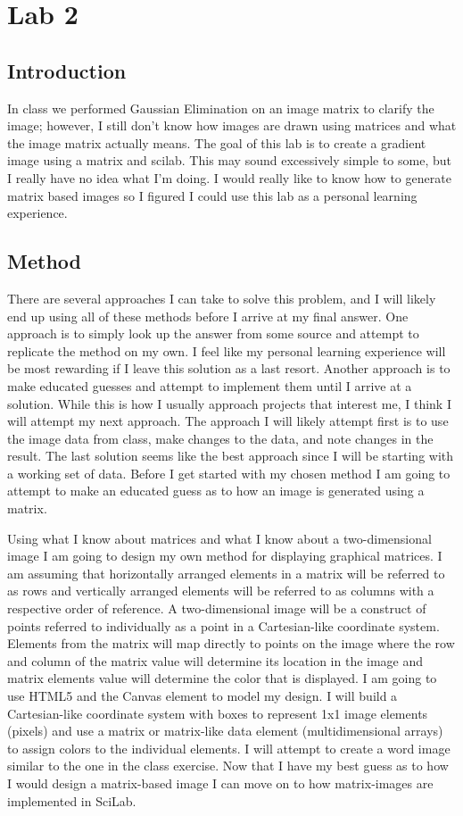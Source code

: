 
\section{Lab 2}
\subsection{Introduction}
In class we performed Gaussian Elimination on an image matrix to clarify the image; however, I still don't know how images are drawn using matrices and what the image matrix actually means. The goal of this lab is to create a gradient image using a matrix and scilab. This may sound excessively simple to some, but I really have no idea what I'm doing. I would really like to know how to generate matrix based images so I figured I could use this lab as a personal learning experience.

\subsection{Method}
There are several approaches I can take to solve this problem, and I will likely end up using all of these methods before I arrive at my final answer. One approach is to simply look up the answer from some source and attempt to replicate the method on my own. I feel like my personal learning experience will be most rewarding if I leave this solution as a last resort. Another approach is to make educated guesses and attempt to implement them until I arrive at a solution. While this is how I usually approach projects that interest me, I think I will attempt my next approach. The approach I will likely attempt first is to use the image data from class, make changes to the data, and note changes in the result. The last solution seems like the best approach since I will be starting with a working set of data. Before I get started with my chosen method I am going to attempt to make an educated guess as to how an image is generated using a matrix.

Using what I know about matrices and what I know about a two-dimensional image I am going to design my own method for displaying graphical matrices. I am assuming that horizontally arranged elements in a matrix will be referred to as rows and vertically arranged elements will be referred to as columns with a respective order of reference. A two-dimensional image will be a construct of points referred to individually as a point in a Cartesian-like coordinate system. Elements from the matrix will map directly to points on the image where the row and column of the matrix value will determine its location in the image and matrix elements value will determine the color that is displayed. I am going to use HTML5 and the Canvas element to model my design. I will build a Cartesian-like coordinate system with boxes to represent 1x1 image elements (pixels) and use a matrix or matrix-like data element (multidimensional arrays) to assign colors to the individual elements. I will attempt to create a word image similar to the one in the class exercise. Now that I have my best guess as to how I would design a matrix-based image I can move on to how matrix-images are implemented in SciLab.

